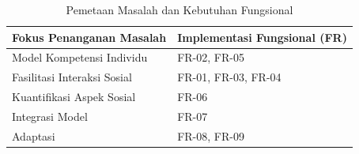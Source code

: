 \begin{table}[H]
    \centering
    \captionsetup{justification=centering}
    \caption{Pemetaan Masalah dan Kebutuhan Fungsional}
    \label{tbl:pemetaan-kebutuhan}
    \renewcommand{\arraystretch}{1.3} %
    \begin{tabular}{|l|p{}|}
    \hline
    \textbf{Fokus Penanganan Masalah} & \textbf{Implementasi Fungsional (FR)} \\
    \hline
    Model Kompetensi Individu & FR-02, FR-05 \\
    \hline
    Fasilitasi Interaksi Sosial & FR-01, FR-03, FR-04 \\
    \hline
    Kuantifikasi Aspek Sosial & FR-06 \\
    \hline
    Integrasi Model & FR-07 \\
    \hline
    Adaptasi & FR-08, FR-09 \\
    \hline
    \end{tabular}
\end{table}